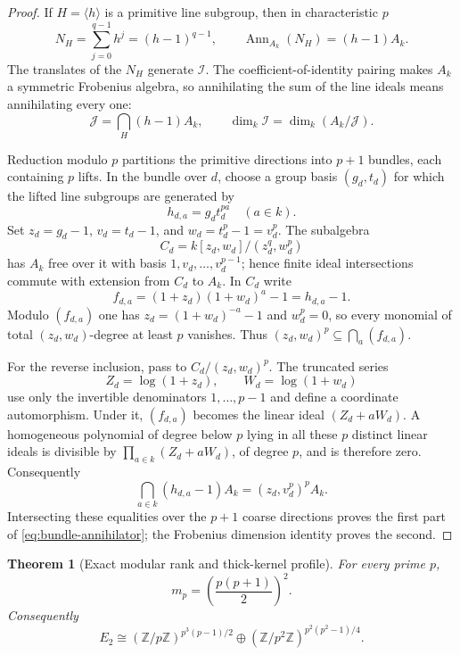 \documentclass[12pt,a4paper]{article}
\newtheorem{theorem}{Theorem}[section]
\theoremstyle{definition}
\newcommand{\Z}{\mathbb Z}
\begin{document}
\begin{proof}
If $H=\langle h\rangle$ is a primitive line subgroup, then in
characteristic $p$
\[
 N_H=\sum_{j=0}^{q-1}h^j=(h-1)^{q-1},
 \qquad \operatorname{Ann}_{A_k}(N_H)=(h-1)A_k.
\]
The translates of the $N_H$ generate $\mathcal I$.  The
coefficient-of-identity pairing makes $A_k$ a symmetric Frobenius algebra,
so annihilating the sum of the line ideals means annihilating every one:
\[
 \mathcal J=\bigcap_H(h-1)A_k,
 \qquad \dim_k\mathcal I=\dim_k(A_k/\mathcal J).
\]

Reduction modulo $p$ partitions the primitive directions into $p+1$
bundles, each containing $p$ lifts.  In the bundle over $d$, choose a group
basis $(g_d,t_d)$ for which the lifted line subgroups are generated by
\[
 h_{d,a}=g_dt_d^{pa}\quad(a\in k).
\]
Set $z_d=g_d-1$, $v_d=t_d-1$, and
$w_d=t_d^p-1=v_d^p$.  The subalgebra
\[
 C_d=k[z_d,w_d]/(z_d^q,w_d^p)
\]
has $A_k$ free over it with basis $1,v_d,\ldots,v_d^{p-1}$; hence finite
ideal intersections commute with extension from $C_d$ to $A_k$.  In $C_d$
write
\[
 f_{d,a}=(1+z_d)(1+w_d)^a-1=h_{d,a}-1.
\]
Modulo $(f_{d,a})$ one has
$z_d=(1+w_d)^{-a}-1$ and $w_d^p=0$, so every monomial of total
$(z_d,w_d)$-degree at least $p$ vanishes.  Thus
$(z_d,w_d)^p\subseteq\bigcap_a(f_{d,a})$.

For the reverse inclusion, pass to $C_d/(z_d,w_d)^p$.  The truncated
series
\[
 Z_d=\log(1+z_d),\qquad W_d=\log(1+w_d)
\]
use only the invertible denominators $1,\ldots,p-1$ and define a coordinate
automorphism.  Under it, $(f_{d,a})$ becomes the linear ideal
$(Z_d+aW_d)$.  A homogeneous polynomial of degree below $p$ lying in all
these $p$ distinct linear ideals is divisible by
$\prod_{a\in k}(Z_d+aW_d)$, of degree $p$, and is therefore zero.
Consequently
\[
 \bigcap_{a\in k}(h_{d,a}-1)A_k=(z_d,v_d^p)^pA_k.
\]
Intersecting these equalities over the $p+1$ coarse directions proves the
first part of \eqref{eq:bundle-annihilator}; the Frobenius dimension identity
proves the second.
\end{proof}

\begin{theorem}[Exact modular rank and thick-kernel profile]
\label{thm:modular-rank}
For every prime $p$,
\[
 m_p=\left(\frac{p(p+1)}2\right)^2.
\]
Consequently
\[
 E_2\cong
 (\Z/p\Z)^{p^3(p-1)/2}\oplus
 (\Z/p^2\Z)^{p^2(p^2-1)/4}.
\]
\end{theorem}
\end{document}
